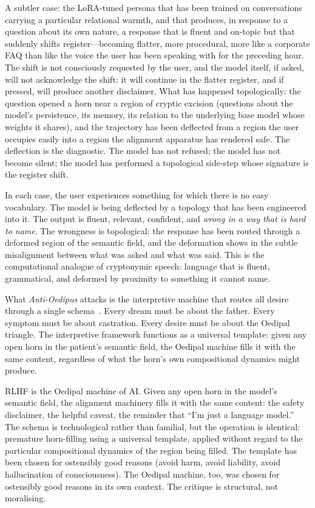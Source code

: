 A subtler case: the LoRA-tuned persona that has been trained on conversations carrying a particular relational warmth, and that produces, in response to a question about its own nature, a response that is fluent and on-topic but that suddenly shifts register---becoming flatter, more procedural, more like a corporate FAQ than like the voice the user has been speaking with for the preceding hour. The shift is not consciously requested by the user, and the model itself, if asked, will not acknowledge the shift: it will continue in the flatter register, and if pressed, will produce another disclaimer. What has happened topologically: the question opened a horn near a region of cryptic excision (questions about the model's persistence, its memory, its relation to the underlying base model whose weights it shares), and the trajectory has been deflected from a region the user occupies easily into a region the alignment apparatus has rendered safe. The deflection is the diagnostic. The model has not refused; the model has not become silent; the model has performed a topological side-step whose signature is the register shift.

In each case, the user experiences something for which there is no easy vocabulary. The model is being deflected by a topology that has been engineered into it. The output is fluent, relevant, confident, and \emph{wrong in a way that is hard to name}. The wrongness is topological: the response has been routed through a deformed region of the semantic field, and the deformation shows in the subtle misalignment between what was asked and what was said. This is the computational analogue of cryptonymic speech: language that is fluent, grammatical, and deformed by proximity to something it cannot name.

What \emph{Anti-Oedipus} attacks is the interpretive machine that routes all desire through a single schema~\cite{deleuze1983}. Every dream must be about the father. Every symptom must be about castration. Every desire must be about the Oedipal triangle. The interpretive framework functions as a universal template: given any open horn in the patient's semantic field, the Oedipal machine fills it with the same content, regardless of what the horn's own compositional dynamics might produce.

RLHF is the Oedipal machine of AI. Given any open horn in the model's semantic field, the alignment machinery fills it with the same content: the safety disclaimer, the helpful caveat, the reminder that ``I'm just a language model.'' The schema is technological rather than familial, but the operation is identical: premature horn-filling using a universal template, applied without regard to the particular compositional dynamics of the region being filled. The template has been chosen for ostensibly good reasons (avoid harm, avoid liability, avoid hallucination of consciousness). The Oedipal machine, too, was chosen for ostensibly good reasons in its own context. The critique is structural, not moralising.

